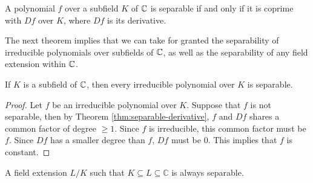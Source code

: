 \begin{theorem} \label{thm:separable-derivative}
    A polynomial $f$ over a subfield $K$ of  $\mathbb C$ is separable if and only if it is coprime with $Df$ over $K$, where $Df$ is its derivative. 
\end{theorem}

The next theorem implies that we can take for granted the separability of irreducible polynomials over subfields of $\mathbb C$, as well as the separability of any field extension within $\mathbb C$.


\begin{theorem} \label{thm:separable-poly-in-C}
    If $K$ is a subfield of $\mathbb C$, then every irreducible polynomial over $K$ is separable. 
\end{theorem}

\begin{proof}
    Let $f$ be an irreducible polynomial over $K$. Suppose that $f$ is not separable, then by Theorem \ref{thm:separable-derivative}, $f$ and $Df$ shares a common factor of degree $\ge 1$. Since $f$ is irreducible, this common factor must be $f$. Since $Df$ has a smaller degree than $f$, $Df$ must be $0$. This implies that $f$ is constant.
\end{proof}


\begin{corollary} \label{thm:separable-extension-in-C}
    A field extension $L/K$ such that $K \subseteq L \subseteq \mathbb C$ is always separable. 
\end{corollary}



